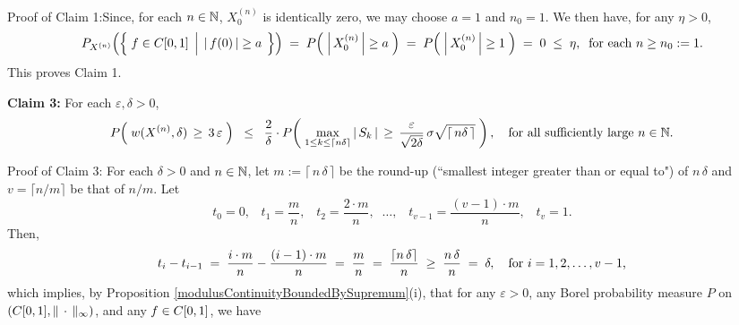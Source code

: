 \vskip 0.5cm
\noindent
Proof of Claim 1:\quad Since, for each $n \in \mathbb{N}$, $X^{(n)}_{0}$ is identically zero, we may
choose $a = 1$ and $n_{0} = 1$. We then have, for any $\eta > 0$,
\begin{equation*}
	P_{X^{(n)}}\!\left(\left\{\;
		f \in \Czo
		\;\left\vert\;\,
		\vert\,f(0)\,\vert \overset{{\color{white}.}}{\geq} a
		\right.
	\;\right\}\right)
	\;=\;
	P\!\left(\; \left\vert\,X^{(n)}_{0}\,\right\vert \overset{{\color{white}.}}{\geq} a \;\right)
	\;=\;
	P\!\left(\; \left\vert\,X^{(n)}_{0}\,\right\vert \overset{{\color{white}.}}{\geq} 1 \;\right)
	\;=\; 0 \;\leq\; \eta,
	\;\;\textnormal{for each $n \geq n_{0} := 1$}.
\end{equation*}
This proves Claim 1.

\vskip 0.5cm
\begin{center}
\begin{minipage}{6.5in}
\noindent
\textbf{Claim 3:}\quad
For each $\varepsilon, \delta > 0$,
\begin{equation*}
P\!\left(\; w(X^{(n)},\delta) \,\overset{{\color{white}.}}{\geq}\, 3\,\varepsilon \;\right)
\;\; \leq \;\;	\dfrac{2}{\delta}\cdot
	P\!\left(\;
		\underset{1 \leq k\leq\lceil n\delta \rceil}{\max}\,\vert\,S_{k}\,\vert
		\,\overset{{\color{white}.}}{\geq}\,
		\dfrac{\varepsilon}{\sqrt{2\delta}}\,\sigma\sqrt{\lceil\,n\delta\,\rceil} 
	\;\right),
	\quad\textnormal{for all sufficiently large $n \in \N$}.
\end{equation*}
\end{minipage}
\end{center}
Proof of Claim 3:\quad
For each $\delta > 0$ and $n \in \mathbb{N}$,
let $m := \lceil\,n\,\delta\,\rceil$ be the round-up (``smallest integer greater than or equal to") of $n\,\delta$
and $v = \lceil n/m \rceil$ be that of $n / m$. Let
\begin{equation*}
t_{0} = 0,
\;\;\; t_{1} = \dfrac{m}{n},
\;\;\; t_{2} = \dfrac{2\cdot m}{n},
\;\;\ldots,
\;\;\; t_{v-1} = \dfrac{(v-1)\cdot m}{n},
\;\;\; t_{v} = 1.
\end{equation*}
Then,
\begin{equation*}
t_{i} - t_{i-1}
\;=\; \dfrac{i\cdot m}{n} - \dfrac{(i-1)\cdot m}{n}
\;=\; \dfrac{m}{n}
\;=\; \dfrac{\lceil n\,\delta \rceil}{n}
\;\geq\; \dfrac{n\,\delta}{n}
\;=\; \delta,
\quad
\textnormal{for $i = 1, 2, \ldots, v-1$,}
\end{equation*}
which implies, by Proposition \ref{modulusContinuityBoundedBySupremum}(i),
that for any $\varepsilon > 0$, any Borel probability measure $P$ on
$\left(C[0,1],\Vert\,\cdot\,\Vert_{\infty}\right)$, and any $f \in C[0,1]$, we have
